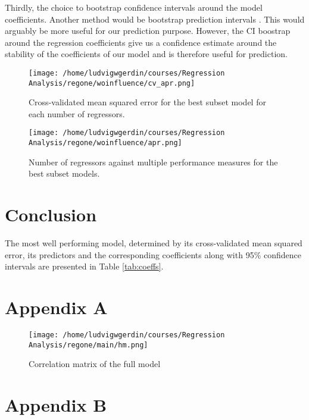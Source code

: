 \documentclass[11pt]{article}
\begin{document}
Thirdly, the choice to bootstrap confidence intervals around the model coefficients. Another method 
would be bootstrap prediction intervals \cite{davison_hinkley_1997}. This 
would arguably be more useful for our prediction purpose. However, the CI boostrap around the regression 
coefficients give us a confidence estimate around the stability of the coefficients of our model and is
therefore useful for prediction.



\begin{figure}[htbp]
\centering
\texttt{[image: /home/ludvigwgerdin/courses/Regression Analysis/regone/woinfluence/cv\_apr.png]}
\caption{\label{fig:orga3a02b1}
Cross-validated mean squared error for the best subset model for each number of regressors.}
\end{figure}

\begin{figure}[htbp]
\centering
\texttt{[image: /home/ludvigwgerdin/courses/Regression Analysis/regone/woinfluence/apr.png]}
\caption{\label{fig:orga0d1e04}
Number of regressors against multiple performance measures for the best subset models.}
\end{figure}

\newpage
\section{Conclusion}
\label{sec:org3995407}

The most well performing model, determined by its cross-validated 
mean squared error, its predictors and the corresponding coefficients along with 95\% confidence intervals are 
presented in Table \ref{tab:coeffs}. 



\section{Appendix A}
\label{sec:orgb03ead1}

\begin{figure}[H]
\centering
\texttt{[image: /home/ludvigwgerdin/courses/Regression Analysis/regone/main/hm.png]}
\caption{\label{fig:orgcb661c1}
Correlation matrix of the full model}
\end{figure}

\newpage

\section{Appendix B}
\label{sec:org27d636a}
\end{document}
